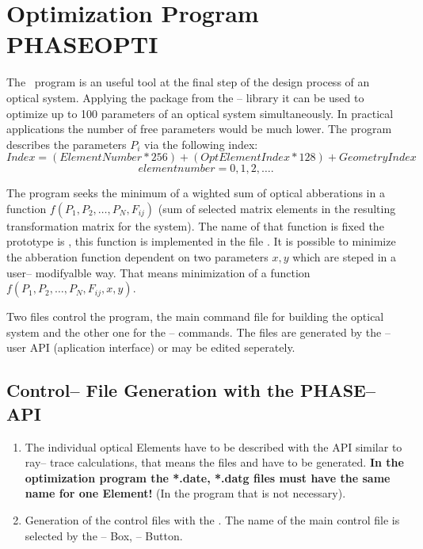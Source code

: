 

\chapter{Optimization Program PHASEOPTI}   
The \phaseopti ~program is an useful tool at the final step of the design 
process of an optical system. Applying the \minuit package from the \cern--
library \cite {MINUIT} it can be used to optimize up to 100 parameters  of 
an optical system simultaneously. In practical applications the 
number of free parameters would be much lower. The program describes the  
parameters $P_i$ via the following index:
\[ Index= (ElementNumber * 256) + (OptElementIndex * 128) + GeometryIndex \] 
\[ elementnumber = 0, 1, 2, \ldots .\]

The program seeks the minimum of a wighted sum of optical abberations in a 
function \mbox {} $f(P_1, P_2,\ldots, P_N, F_{ij})$ (sum of selected matrix 
elements in 
the resulting transformation matrix for the system). The name of that function
 is fixed the prototype is , this function is 
implemented in the file 
. It is possible to minimize the abberation function dependent 
on two parameters $x, y$ which are steped in a user-- modifyalble way. That 
means minimization of a function $f(P_1, P_2,\ldots, P_N, F_{ij}, x, y)$. 

Two files control the program, the main command file for building the optical 
system and the other one for the \minuit --  commands.
The files are generated by the  \phase-- user API (aplication interface) or 
may be edited seperately.

\section {Control-- File Generation with the PHASE-- API}
\begin{enumerate}
\item The individual optical Elements have to be described with the 
 \phase API similar to ray-- trace calculations, that means the files 
 and  have to be generated. 
{\bf In the optimization program the  *.date, *.datg files must have the same 
name for one Element!} (In the \phase program that is not necessary). 
\item Generation of the control files with the .
The name of the main control file  is selected by the 
-- Box, -- Button. 
\end {enumerate}         

